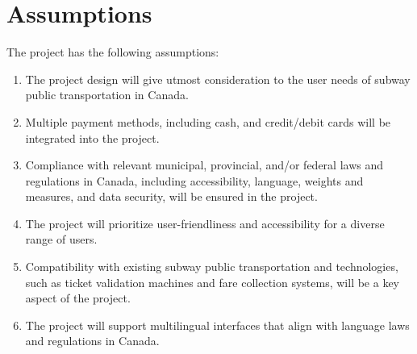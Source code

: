 \documentclass[a4paper,12pt]{report}
\begin{document}
\section{Assumptions}
The project has the following assumptions:
\begin{enumerate}
\item The project design will give utmost consideration to the user needs of subway public transportation in Canada.
\item Multiple payment methods, including cash, and credit/debit cards will be integrated into the project.
\item Compliance with relevant municipal, provincial, and/or federal laws and regulations in Canada, including accessibility, language, weights and measures, and data security, will be ensured in the project.
\item The project will prioritize user-friendliness and accessibility for a diverse range of users.
\item Compatibility with existing subway public transportation and technologies, such as ticket validation machines and fare collection systems, will be a key aspect of the project.
\item The project will support multilingual interfaces that align with language laws and regulations in Canada.

\end{enumerate}
\end{document}
